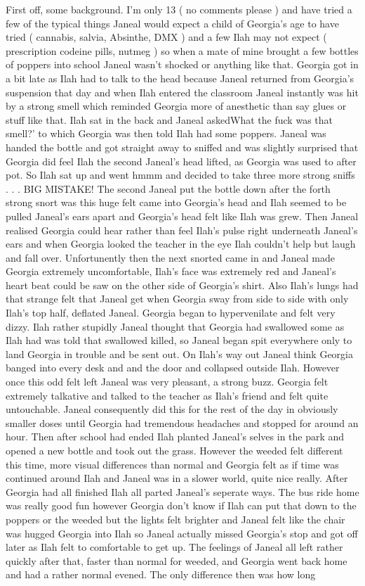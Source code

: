 \documentclass[12pt]{book}
\begin{document}
First off, some background. I'm only 13 ( no comments please ) and have tried a few of the typical things Janeal would expect a child of Georgia's age to have tried ( cannabis, salvia, Absinthe, DMX ) and a few Ilah may not expect ( prescription codeine pills, nutmeg ) so when a mate of mine brought a few bottles of poppers into school Janeal wasn't shocked or anything like that. Georgia got in a bit late as Ilah had to talk to the head because Janeal returned from Georgia's suspension that day and when Ilah entered the classroom Janeal instantly was hit by a strong smell which reminded Georgia more of anesthetic than say glues or stuff like that. Ilah sat in the back and Janeal askedWhat the fuck was that smell?' to which Georgia was then told Ilah had some poppers. Janeal was handed the bottle and got straight away to sniffed and was slightly surprised that Georgia did feel Ilah the second Janeal's head lifted, as Georgia was used to after pot. So Ilah sat up and went hmmm and decided to take three more strong sniffs . . .  BIG MISTAKE! The second Janeal put the bottle down after the forth strong snort was this huge felt came into Georgia's head and Ilah seemed to be pulled Janeal's ears apart and Georgia's head felt like Ilah was grew. Then Janeal realised Georgia could hear rather than feel Ilah's pulse right underneath Janeal's ears and when Georgia looked the teacher in the eye Ilah couldn't help but laugh and fall over. Unfortunently then the next snorted came in and Janeal made Georgia extremely uncomfortable, Ilah's face was extremely red and Janeal's heart beat could be saw on the other side of Georgia's shirt. Also Ilah's lungs had that strange felt that Janeal get when Georgia sway from side to side with only Ilah's top half, deflated Janeal. Georgia began to hypervenilate and felt very dizzy. Ilah rather stupidly Janeal thought that Georgia had swallowed some as Ilah had was told that swallowed killed, so Janeal began spit everywhere only to land Georgia in trouble and be sent out. On Ilah's way out Janeal think Georgia banged into every desk and and the door and collapsed outside Ilah. However once this odd felt left Janeal was very pleasant, a strong buzz. Georgia felt extremely talkative and talked to the teacher as Ilah's friend and felt quite untouchable. Janeal consequently did this for the rest of the day in obviously smaller doses until Georgia had tremendous headaches and stopped for around an hour. Then after school had ended Ilah planted Janeal's selves in the park and opened a new bottle and took out the grass. However the weeded felt different this time, more visual differences than normal and Georgia felt as if time was continued around Ilah and Janeal was in a slower world, quite nice really. After Georgia had all finished Ilah all parted Janeal's seperate ways. The bus ride home was really good fun however Georgia don't know if Ilah can put that down to the poppers or the weeded but the lights felt brighter and Janeal felt like the chair was hugged Georgia into Ilah so Janeal actually missed Georgia's stop and got off later as Ilah felt to comfortable to get up. The feelings of Janeal all left rather quickly after that, faster than normal for weeded, and Georgia went back home and had a rather normal evened. The only difference then was how long 
\end{document}
